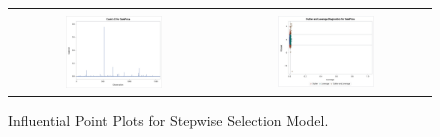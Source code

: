 \documentclass[11pt]{scrartcl} %
\begin{document}
\begin{figure}[H] %
	\centering
	\begin{tabular}{p{} p{}}
\hline	
	\multicolumn{1}{|c}{} &  \multicolumn{1}{c|}{} \\
		\multicolumn{1}{|c}{\includegraphics[width=0.48\textwidth]{../graphics/A2SWcooks}} &
		\multicolumn{1}{c|}{\includegraphics[width=0.48\textwidth]{../graphics/A2SWlev}}\\
		\hline
	\end{tabular}		
	\caption{Influential Point Plots for Stepwise Selection Model.} %
	\label{fig:A2SWIP}
\end{figure}
\end{document}
